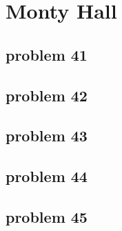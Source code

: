 \section{Monty Hall}

\subsection{problem 41}


\subsection{problem 42}


\subsection{problem 43}


\subsection{problem 44}


\subsection{problem 45}
